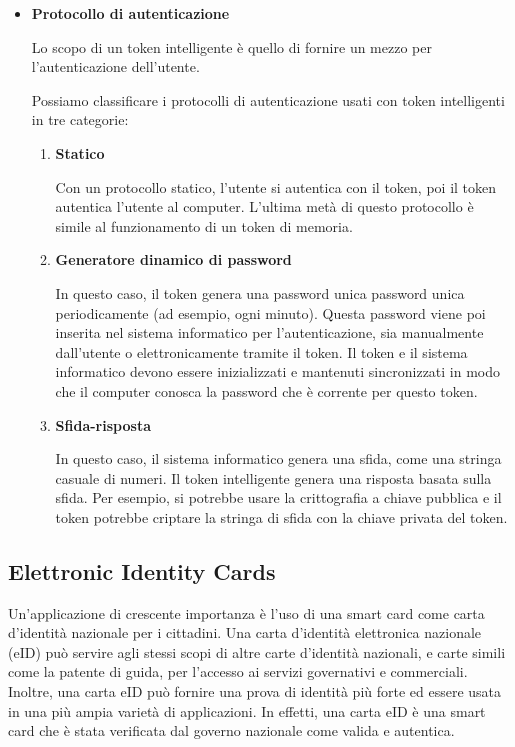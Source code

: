 \begin{itemize}
\begin{itemize}
        \item \textbf{Protocollo di autenticazione}
        
        Lo scopo di un token intelligente è quello di fornire un mezzo per l'autenticazione dell'utente.
        
        \newpage
        
        Possiamo classificare i protocolli di autenticazione usati con token intelligenti in tre categorie:
        
        \begin{enumerate}
            \item \textbf{Statico}
            
            Con un protocollo statico, l'utente si autentica con il token, poi il token autentica l'utente al computer. L'ultima metà di questo protocollo è simile al funzionamento di un token di memoria.
            
            \item \textbf{Generatore dinamico di password}
            
            In questo caso, il token genera una password unica password unica periodicamente (ad esempio, ogni minuto). Questa password viene poi inserita nel sistema informatico per l'autenticazione, sia manualmente dall'utente o elettronicamente tramite il token. Il token e il sistema informatico devono essere inizializzati e mantenuti sincronizzati in modo che il computer conosca la password che è corrente per questo token.
            
            \item \textbf{Sfida-risposta}
            
            In questo caso, il sistema informatico genera una sfida, come una stringa casuale di numeri. Il token intelligente genera una risposta basata sulla sfida. Per esempio, si potrebbe usare la crittografia a chiave pubblica e il token potrebbe criptare la stringa di sfida con la chiave privata del token.
        \end{enumerate}
    \end{itemize}
\end{itemize}

\newpage
\subsection{Elettronic Identity Cards}
Un'applicazione di crescente importanza è l'uso di una smart card come carta d'identità nazionale per i cittadini. Una carta d'identità elettronica nazionale (eID) può servire agli stessi scopi di altre carte d'identità nazionali, e carte simili come la patente di guida, per l'accesso ai servizi governativi e commerciali. Inoltre, una carta eID può fornire una prova di identità più forte ed essere usata in una più ampia varietà di applicazioni. In effetti, una carta eID è una smart card che è stata verificata dal governo nazionale come valida e autentica.

